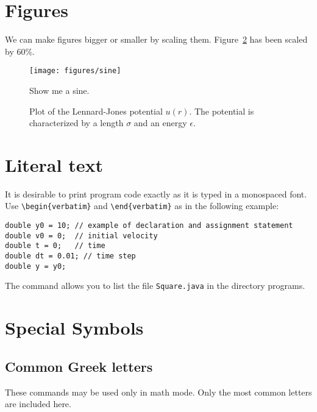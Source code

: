 \documentclass[12pt]{article}
\begin{document}
 \section{Figures}

 We can make figures bigger or smaller by scaling them. Figure~\ref{fig:lj}
 has been scaled by 60\%.

 \begin{figure}[h]
  \begin{center}
   \texttt{[image: figures/sine]}
   \caption{\label{fig:typical}Show me a sine.}
  \end{center}
 \end{figure}

 \begin{figure}[h]
  \begin{center}
   \caption{\label{fig:lj}Plot of the
   Lennard-Jones potential
    $u(r)$. The potential is characterized by a length
    $\sigma$ and an energy
    $\epsilon$.}
  \end{center}
 \end{figure}

 \section{Literal text}
 It is desirable to print program code exactly as it is typed in a
 monospaced font. Use \verb!\begin{verbatim}! and
 \verb!\end{verbatim}! as in the following example:
 \begin{verbatim}
double y0 = 10; // example of declaration and assignment statement
double v0 = 0;  // initial velocity
double t = 0;   // time
double dt = 0.01; // time step
double y = y0;
 \end{verbatim}
 The command \verb!! allows
 you to list the file \texttt{Square.java} in the directory
 programs.

 \section{Special Symbols}

 \subsection{Common Greek letters}

 These commands may be used only in math mode. Only the most common
 letters are included here.
\end{document}
